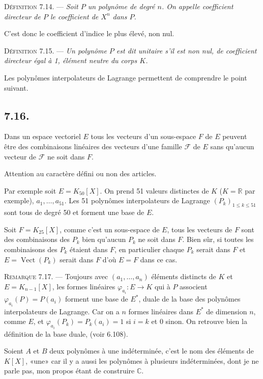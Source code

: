 \medskip\noindent\textsc{Définition 7.14.} --- \emph{Soit $P$ un polynôme de degré $n$. On appelle coefficient directeur de $P$ le coefficient de $X^n$ dans $P$.}

C'est donc le coefficient d'indice le plus élevé, non nul.

\medskip\noindent\textsc{Définition 7.15.} --- \emph{Un polynôme $P$ est dit unitaire s'il est non nul, de coefficient directeur égal à 1, élément neutre du corps $K$.}

Les polynômes interpolateurs de Lagrange permettent de comprendre le point suivant.

\subsection*{7.16.}

Dans un espace vectoriel $E$ tous les vecteurs d'un sous-espace $F$ de $E$ peuvent être des combinaisons linéaires des vecteurs d'une famille $\mathcal F$ de $E$ sans qu'aucun vecteur de $\mathcal F$ ne soit dans $F$.

Attention au caractère défini ou non des articles.

Par exemple soit $E=K_{50}[X]$. On prend 51 valeurs distinctes de $K$ ($K=\mathbb R$ par exemple), $a_1,\ldots,a_{51}$. Les 51 polynômes interpolateurs de Lagrange $(P_k)_{1\le k\le51}$ sont tous de degré 50 et forment une base de $E$.

Soit $F=K_{25}[X]$, comme c'est un sous-espace de $E$, tous les vecteurs de $F$ sont des combinaisons des $P_k$ bien qu'aucun $P_k$ ne soit dans $F$. Bien sûr, si toutes les combinaisons des $P_k$ étaient dans $F$, en particulier chaque $P_k$ serait dans $F$ et $E=\operatorname{Vect}(P_k)$ serait dans $F$ d'où $E=F$ dans ce cas.

\medskip\noindent\textsc{Remarque 7.17.} --- Toujours avec $(a_1,\ldots,a_n)$ éléments distincts de $K$ et $E=K_{n-1}[X]$, les formes linéaires $\varphi_{a_i}:E\to K$ qui à $P$ associent $\varphi_{a_i}(P)=P(a_i)$ forment une base de $E^*$, duale de la base des polynômes interpolateurs de Lagrange. Car on a $n$ formes linéaires dans $E^*$ de dimension $n$, comme $E$, et $\varphi_{a_i}(P_k)=P_k(a_i)=1$ si $i=k$ et 0 sinon. On retrouve bien la définition de la base duale, (voir 6.108).


Soient $A$ et $B$ deux polynômes à une indéterminée, c'est le nom des éléments de $K[X]$, «une» car il y a aussi les polynômes à plusieurs indéterminées, dont je ne parle pas, mon propos étant de construire $\mathbb C$.

